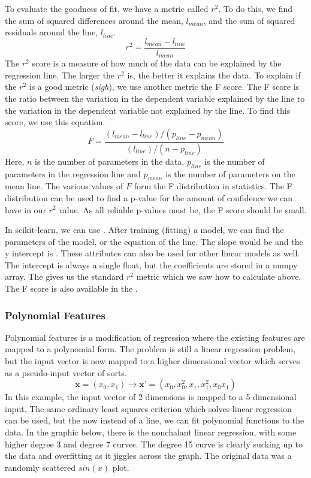 \documentclass{article}
\newcommand{\code}[1]{{\fontfamily{zi4} \selectfont{#1}}}
\begin{document}
To evaluate the goodness of fit, we have a metric called $r^2$. To do this, we find the sum of squared differences around the mean, $l_{mean}$, and the sum of squared residuals around the line, $l_{line}$. 
$$r^2 = \frac{l_{mean} - l_{line}}{l_{mean}}$$
The $r^2$ score is a measure of how much of the data can be explained by the regression line. The larger the $r^2$ is, the better it explains the data. To explain if the $r^2$ is a good metric (\textit{sigh}), we use another metric the F score. The F score is the ratio between the variation in the dependent variable explained by the line to the variation in the dependent variable not explained by the line. To find this score, we use this equation.
$$F = \frac{(l_{mean}-l_{line})/(p_{line}-p_{mean})}{(l_{line})/(n-p_{line})}$$
Here, $n$ is the number of parameters in the data, $p_{line}$ is the number of parameters in the regression line and $p_{mean}$ is the number of parameters on the mean line. The various values of $F$ form the F distribution in statistics. The F distribution can be used to find a p-value for the amount of confidence we can have in our $r^2$ value. As all reliable p-values must be, the F score should be small.

In scikit-learn, we can use \code{sklearn.linear\_models.LinearRegression}. After training (fitting) a model, we can find the parameters of the model, or the equation of the line. The slope would be \code{model.coef\_} and the y intercept is \code{model.intercept\_}. These attributes can also be used for other linear models as well. The intercept is always a single float, but the coefficients are stored in a numpy array. The \code{model.score()} gives us the standard $r^2$ metric which we saw how to calculate above. The F score is also available in the \code{sklearn.feature\_selection.f\_regression}.

\subsubsection{Polynomial Features}
Polynomial features is a modification of regression where the existing features are mapped to a polynomial form. The problem is still a linear regression problem, but the input vector is now mapped to a higher dimensional vector which serves as a pseudo-input vector of sorts.
$$\textbf{x} = (x_0, x_1) \rightarrow \textbf{x'} = (x_0, x^2_0, x_1, x^2_1, x_0 x_1)$$
In this example, the input vector of 2 dimensions is mapped to a 5 dimensional input. The same ordinary least squares criterion which solves linear regression can be used, but the now instead of a line, we can fit polynomial functions to the data. In the graphic below, there is the nonchalant linear regression, with some higher degree 3 and degree 7 curves. The degree 15 curve is clearly sucking up to the data and overfitting as it jiggles across the graph. The original data was a randomly scattered $sin(x)$ plot.
\end{document}
